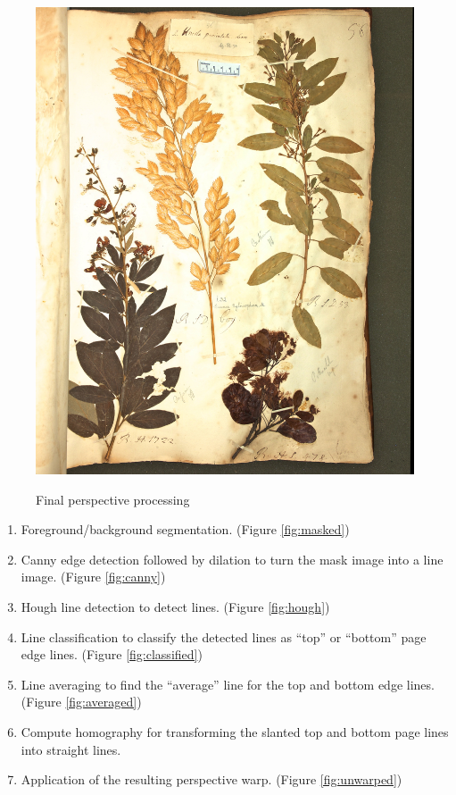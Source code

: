 \documentclass[runningheads,a4paper]{llncs}
\begin{document}
\begin{figure}[htbm]
{  \includegraphics[height=.35\textheight]{figures/Catesby_HS232_056_0602-unwarped-stretch.jpg}
  \label{fig:unwarped}
  }
  \caption{Final perspective processing}\label{fig:final}
\end{figure}

\begin{figure}[htbm]
  
\end{figure}

\begin{enumerate}
  \item Foreground/background segmentation. (Figure \ref{fig:masked})
  \item Canny edge detection followed by dilation to turn the mask image into a line image. (Figure \ref{fig:canny})
  \item Hough line detection to detect lines. (Figure \ref{fig:hough})
  \item Line classification to classify the detected lines as “top” or “bottom” page edge lines. (Figure \ref{fig:classified})
  \item Line averaging to find the “average” line for the top and bottom edge lines. (Figure \ref{fig:averaged})
  \item Compute homography for transforming the slanted top and bottom page lines into straight lines.
  \item Application of the resulting perspective warp. (Figure \ref{fig:unwarped})
\end{enumerate}
\end{document}
